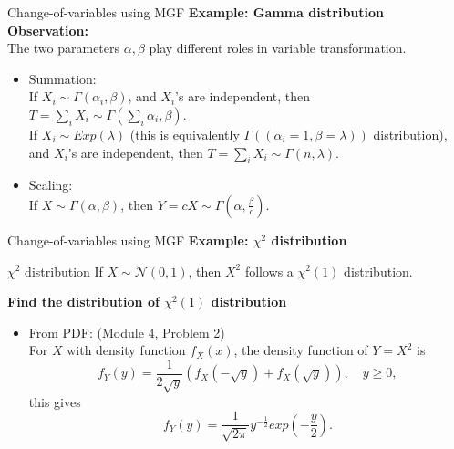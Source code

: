 \documentclass [aspectratio=169]{beamer}
\newcommand{\mc}{\mathcal}
\begin{document}
\begin{frame}{Change-of-variables using MGF}
    \textbf{Example: Gamma distribution}\\
    \vspace{0.1in}
    \textbf{Observation:}\\
    The two parameters $\alpha, \beta$ play different roles in variable transformation. 
    \vspace{0.1in}
   \begin{itemize}
       \item Summation: \\
       If $X_i \sim \Gamma(\alpha_i, \beta)$, and $X_i$'s are independent, then $T = \sum_{i} {X_i} \sim \Gamma(\sum_{i}{\alpha_i}, \beta)$.\\
       If $X_i \sim Exp(\lambda)$ (this is equivalently $\Gamma((\alpha_i = 1, \beta = \lambda))$ distribution), and $X_i$'s are independent, then $T = \sum_{i} {X_i} \sim \Gamma(n, \lambda)$.\\
       \vspace{0.1in}
       \item Scaling: \\
       If $X \sim \Gamma(\alpha, \beta)$, then $Y = cX \sim \Gamma(\alpha, \frac{\beta}{c})$.\\
   \end{itemize}
\end{frame}



\begin{frame}{Change-of-variables using MGF}
    \textbf{Example: $\chi^2$ distribution}\\
    \begin{block}{$\chi^2$ distribution}
       If $X \sim \mc{N}(0,1)$, then $X^2$ follows a $\chi^2(1)$ distribution. 
    \end{block}
     \vspace{0.1in}
     \textbf{Find the distribution of $\chi^2(1)$ distribution}
     \begin{itemize}
         \item From PDF: (Module 4, Problem 2)\\
          For $X$ with density function $f_X(x)$, the density function of $Y = X^2$ is
     $$
     f_Y(y) = \dfrac{1}{2\sqrt{y}}(f_X(-\sqrt{y}) + f_X(\sqrt{y}) ), \quad y \ge 0,
     $$
     this gives
     $$
     f_Y(y) = \frac{1}{\sqrt{2\pi}} y^{-\frac{1}{2}}exp(-\frac{y}{2}).
     $$
     \end{itemize}
\end{frame}
\end{document}
